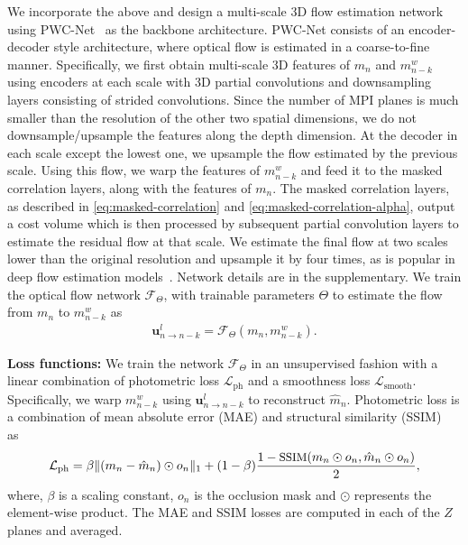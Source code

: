 \documentclass[preprint]{vgtc}
\begin{document}
    We incorporate the above and design a multi-scale 3D flow estimation network using PWC-Net~\cite{sun2018pwcnet} as the backbone architecture.
    PWC-Net consists of an encoder-decoder style architecture, where optical flow is estimated in a coarse-to-fine manner.
    Specifically, we first obtain multi-scale 3D features of $m_n$ and $m^w_{n-k}$ using encoders at each scale with 3D partial convolutions and downsampling layers consisting of strided convolutions.
    Since the number of MPI planes is much smaller than the resolution of the other two spatial dimensions, we do not downsample/upsample the features along the depth dimension.
    At the decoder in each scale except the lowest one, we upsample the flow estimated by the previous scale.
    Using this flow, we warp the features of $m^w_{n-k}$ and feed it to the masked correlation layers, along with the features of $m_n$.
    The masked correlation layers, as described in \autoref{eq:masked-correlation} and \autoref{eq:masked-correlation-alpha}, output a cost volume which is then processed by subsequent partial convolution layers to estimate the residual flow at that scale.
    We estimate the final flow at two scales lower than the original resolution and upsample it by four times, as is popular in deep flow estimation models~\cite{sun2018pwcnet}.
    Network details are in the supplementary.
    We train the optical flow network $\mathcal{F}_\Theta$, with trainable parameters $\Theta$ to estimate the flow from $m_n$ to $m^w_{n-k}$ as
    \begin{align}
        \mathbf{u}^l_{n \rightarrow n-k} = \mathcal{F}_\Theta(m_n, m^w_{n-k}).
    \end{align}

    \textbf{Loss functions:}
    We train the network $\mathcal{F}_{\Theta}$ in an unsupervised fashion with a linear combination of photometric loss $\mathcal{L}_{\text{ph}}$ and a smoothness loss $\mathcal{L}_{\text{smooth}}$.
    Specifically, we warp $m^w_{n-k}$ using $\mathbf{u}^l_{n \rightarrow n-k}$ to reconstruct $\hat{m}_n$.
Photometric loss is a combination of mean absolute error (MAE) and structural similarity (SSIM)~\cite{wang2004image} as
    \begin{align}
        \mathcal{L}_{\text{ph}} = \beta \Vert (m_n - \hat{m}_n)\odot o_n \Vert_1 + (1 - \beta) \frac{1 - \text{\small{SSIM}}(m_n \odot o_n, \hat{m}_n \odot o_n)}{2},
        \label{eq:loss-optical-flow-photometric}
    \end{align}
    where, $\beta$ is a scaling constant, $o_n$ is the occlusion mask and $\odot$ represents the element-wise product.
    The MAE and SSIM losses are computed in each of the $Z$ planes and averaged.
\end{document}
